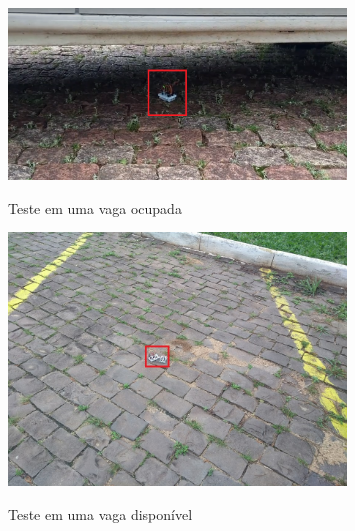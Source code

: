 \documentclass[oneside,openright,12pt]{ufsm_2015} %
\begin{document}
    \begin{figure}[ht]
     	    \caption{\label{exepretex} Teste em uma vaga ocupada}
            \centering
            \includegraphics[width=0.8\textwidth]{figuras/ocupada.png}
            \vspace{\baselineskip} %
            \label{fig:ocupada}
    \end{figure}
    
    \begin{figure}[ht]
     	    \caption{\label{exepretex} Teste em uma vaga disponível}
            \centering
            \includegraphics[width=0.8\textwidth]{figuras/disponivel.jpg}
            \vspace{\baselineskip} %
            \label{fig:disponivel}
    \end{figure}
    
\end{document}
